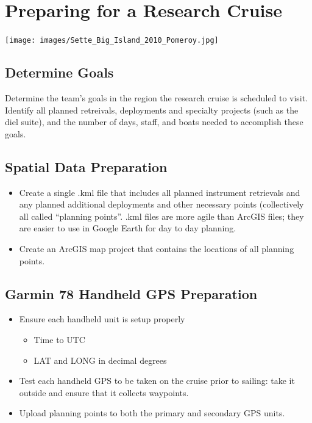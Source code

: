 \documentclass[
]{book}
\providecommand{\tightlist}{%
  \setlength{\itemsep}{0pt}\setlength{\parskip}{0pt}}
\begin{document}
\hypertarget{cruise_prep}{%
\chapter{Preparing for a Research Cruise}\label{cruise_prep}}

\texttt{[image: images/Sette\_Big\_Island\_2010\_Pomeroy.jpg]}

\hypertarget{determine-goals}{%
\section{Determine Goals}\label{determine-goals}}

Determine the team's goals in the region the research cruise is scheduled to visit. Identify all planned retreivals, deployments and specialty projects (such as the diel suite), and the number of days, staff, and boats needed to accomplish these goals.

\hypertarget{spatial-data-preparation}{%
\section{Spatial Data Preparation}\label{spatial-data-preparation}}

\begin{itemize}
\tightlist
\item
  Create a single .kml file that includes all planned instrument retrievals and any planned additional deployments and other necessary points (collectively all called ``planning points''. .kml files are more agile than ArcGIS files; they are easier to use in Google Earth for day to day planning.
\item
  Create an ArcGIS map project that contains the locations of all planning points.
\end{itemize}

\hypertarget{garmin-78-handheld-gps-preparation}{%
\section{Garmin 78 Handheld GPS Preparation}\label{garmin-78-handheld-gps-preparation}}

\begin{itemize}
\tightlist
\item
  Ensure each handheld unit is setup properly

  \begin{itemize}
  \tightlist
  \item
    Time to UTC
  \item
    LAT and LONG in decimal degrees
  \end{itemize}
\item
  Test each handheld GPS to be taken on the cruise prior to sailing: take it outside and ensure that it collects waypoints.
\item
  Upload planning points to both the primary and secondary GPS units.
\end{itemize}
\end{document}
